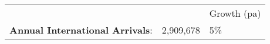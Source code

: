 \begin{tabular}[t]{p{5cm}p{1.3cm}p{1.2cm}}
   &   & Growth (pa) \\ 
 \textbf{Annual International Arrivals}: & 2,909,678 & 5\% \\ 
  \end{tabular}
